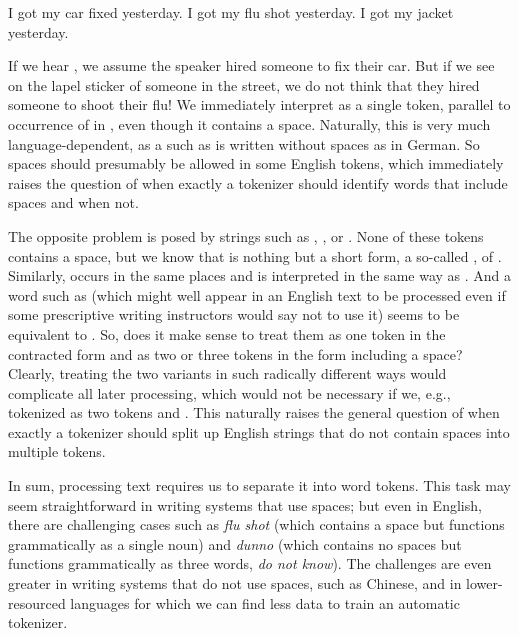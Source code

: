 \ea \ea \label{ex:car} I got my car fixed yesterday.
      \ex \label{ex:flu} I got my flu shot yesterday.
    \ex \label{ex:jacket} I got my jacket yesterday.
\z
\z 

If we hear , we assume the speaker hired someone to fix their car.
But if we see  on the lapel sticker of someone in the
street, we do not think that they hired someone to shoot their flu!
We immediately interpret 
as a single token, parallel to occurrence of  in
, even though it contains a space. Naturally,
this is very much language-dependent, as a  such as  is written
without spaces as  in German. So spaces should
presumably be allowed in some English tokens, which immediately raises
the question of when exactly a tokenizer should identify words that
include spaces and when not.

The opposite problem is posed by strings such as ,
, or . None of these tokens contains a
space, but we know that  is nothing but a short form, a
so-called , of . Similarly,
 occurs in the same places and is interpreted in the
same way as . And a word such as 
(which might well appear in an English text to be processed even if
some prescriptive writing instructors would say not to use it) seems to be equivalent to
. So, does it make sense to treat them as one token
in the contracted form and as two or three tokens in the form
including a space? Clearly, treating the two variants in such radically
different ways would complicate all later processing, which would not
be necessary if we, e.g., tokenized  as two tokens
 and . This naturally raises the general question of
when exactly a tokenizer should split up English strings that do not
contain spaces into multiple tokens.

In sum, processing text requires us to separate it into word tokens.  This task may seem straightforward in writing systems that use spaces; but even in English, there are challenging cases such as \textit{flu shot} (which contains a space but functions grammatically as a single noun) and \textit{dunno} (which contains no spaces but functions grammatically as three words, \textit{do not know}).  The challenges are even greater in writing systems that do not use spaces, such as Chinese, and in lower-resourced languages for which we can find less data to train an automatic tokenizer.  

